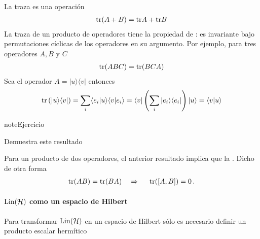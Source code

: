 \documentclass[letterpaper,10pt,english]{jupyterBook}
\newcommand{\bra}[1]{\langle #1|}
\newcommand{\ket}[1]{|#1\rangle}
\newcommand{\braket}[2]{\langle #1|#2\rangle}
\newcommand{\ketbra}[2]{| #1\rangle \langle #2 |}
\newcommand{\Hil}{{\cal H}}
\newcommand{\Lin}{\hbox{Lin}}
\newcommand{\tr}{{\rm tr}}
\begin{document}
\sphinxAtStartPar
La traza es una operación 
\begin{equation*}
\begin{split}
{\rm tr} (A + B ) = {\rm tr}A + {\rm tr}B
\end{split}
\end{equation*}
\sphinxAtStartPar
La traza de un producto de operadores tiene la propiedad de : es invariante bajo permutaciones  cíclicas de los operadores en su argumento. Por ejemplo, para tres operadores \(A, B\) y \(C\)
\begin{equation*}
\begin{split}
{\rm tr}(ABC)= {\rm tr}(BCA) 
\end{split}
\end{equation*}
\sphinxAtStartPar
Sea el operador \(A = \ketbra{u}{v}\) entonces
\begin{equation*}
\begin{split} \tr \left(\rule{0mm}{5mm}\ketbra{u}{v}\right) = \sum_i \braket{e_i}{u}\braket{v}{e_i} = \bra{v}\left(\sum_i \ketbra{e_i}{e_i}\right) \ket{u} = \braket{v}{u}
\end{split}
\end{equation*}
\begin{sphinxadmonition}{note}{Ejercicio}

\sphinxAtStartPar
Demuestra este resultado
\end{sphinxadmonition}

\sphinxAtStartPar
Para un producto de dos operadores, el anterior resultado implica que la . Dicho de otra forma
\begin{equation*}
\begin{split}
{\rm tr}(AB) = {\rm tr}(BA) ~~~\Rightarrow ~~~~{\rm tr}([A,B]) = 0 \, .
\end{split}
\end{equation*}
\sphinxAtStartPar



\paragraph{\protect\(\Lin(\Hil)\protect\) como un espacio de Hilbert}
\label{\detokenize{docs/Part_01_Formalismo/Chapter_01_02_Formalismo_matem_xe1tico/01_03_Operadores_myst:lin-hil-como-un-espacio-de-hilbert}}
\sphinxAtStartPar
Para transformar \(\Lin(\Hil)\) en un espacio de Hilbert sólo es necesario definir un producto escalar hermítico
\end{document}
